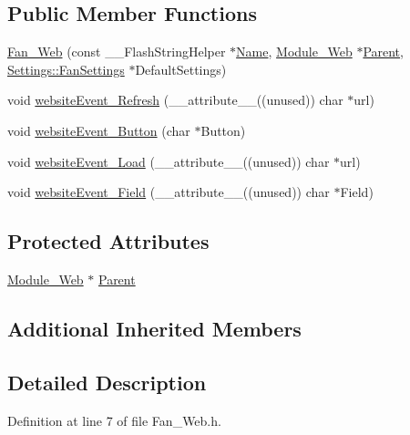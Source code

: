 \subsection*{Public Member Functions}
\begin{DoxyCompactItemize}
\item 
\hyperlink{class_fan___web_a54f9ab383ef943d6b7ffc770b2220024}{Fan\+\_\+\+Web} (const \+\_\+\+\_\+\+Flash\+String\+Helper $\ast$\hyperlink{class_common_aeea91a726dbe988e515057b32ba0726f}{Name}, \hyperlink{class_module___web}{Module\+\_\+\+Web} $\ast$\hyperlink{class_fan___web_ad9f5144b9db9c1194514a3527a92d4d1}{Parent}, \hyperlink{struct_settings_1_1_fan_settings}{Settings\+::\+Fan\+Settings} $\ast$Default\+Settings)
\item 
void \hyperlink{class_fan___web_a328af0b2469de198e88f0dd51758a5cb}{website\+Event\+\_\+\+Refresh} (\+\_\+\+\_\+attribute\+\_\+\+\_\+((unused)) char $\ast$url)
\item 
void \hyperlink{class_fan___web_a2741ea624a781febbd4f3e2bf82c89ed}{website\+Event\+\_\+\+Button} (char $\ast$Button)
\item 
void \hyperlink{class_fan___web_a3d75cb434fbc0b2885acf73b3a1576c9}{website\+Event\+\_\+\+Load} (\+\_\+\+\_\+attribute\+\_\+\+\_\+((unused)) char $\ast$url)
\item 
void \hyperlink{class_fan___web_a0546808ac50ae701ca6b1776a1ce50f8}{website\+Event\+\_\+\+Field} (\+\_\+\+\_\+attribute\+\_\+\+\_\+((unused)) char $\ast$Field)
\end{DoxyCompactItemize}
\subsection*{Protected Attributes}
\begin{DoxyCompactItemize}
\item 
\hyperlink{class_module___web}{Module\+\_\+\+Web} $\ast$ \hyperlink{class_fan___web_ad9f5144b9db9c1194514a3527a92d4d1}{Parent}
\end{DoxyCompactItemize}
\subsection*{Additional Inherited Members}


\subsection{Detailed Description}


Definition at line 7 of file Fan\+\_\+\+Web.\+h.



